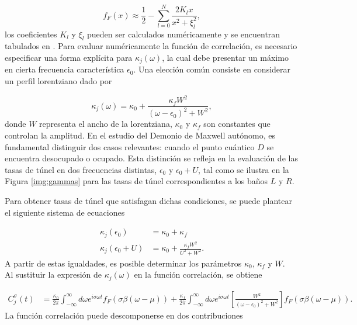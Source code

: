 \begin{appendixs}
\begin{equation}
    f_{F}(x) \approx \frac{1}{2} - \sum_{l=0}^{N} \frac{ 2 K_{l}x }{ x^{2} + \xi^{2}_{l} },
    \label{apendix5:pade}
\end{equation}
los coeficientes $K_{l}$ y $\xi_{l}$ pueden ser calculados numéricamente y se encuentran tabulados en \cite{hu2011pade}. Para evaluar numéricamente la función de correlación, es necesario especificar una forma explícita para $\kappa_{j}(\omega)$, la cual debe presentar un máximo en cierta frecuencia característica $\epsilon_{0}$. Una elección común consiste en considerar un perfil lorentziano dado por

\begin{equation*}
    \kappa_{j}(\omega) = \kappa_{0} + \frac{\kappa_{f} W^{2}}{(\omega - \epsilon_{0})^{2} + W^{2}},
\end{equation*}
donde $W$ representa el ancho de la lorentziana, $\kappa_{0}$ y $\kappa_{f}$ son constantes que controlan la amplitud. En el estudio del Demonio de Maxwell autónomo, es fundamental distinguir dos casos relevantes: cuando el punto cuántico $D$ se encuentra desocupado o ocupado. Esta distinción se refleja en la evaluación de las tasas de túnel en dos frecuencias distintas, $\epsilon_{0}$ y $\epsilon_{0} + U$, tal como se ilustra en la Figura \ref{img:gammas} para las tasas de túnel correspondientes a los baños $L$ y $R$.


Para obtener tasas de túnel que satisfagan dichas condiciones, se puede plantear el siguiente sistema de ecuaciones 

\begin{align*}
    \kappa_{j}(\epsilon_{0}) & = \kappa_{0} + \kappa_{f} \\
    \kappa_{j}(\epsilon_{0} + U) & = \kappa_{0} + \frac{\kappa_{f} W^{2} }{U^{2} + W^{2}}.
\end{align*}
A partir de estas igualdades, es posible determinar los parámetros $\kappa_{0}$, $\kappa_{f}$ y $W$. 
\\

Al sustituir la expresión de $\kappa_{j}(\omega)$ en la función correlación, se obtiene

\begin{align*}
    C^{\sigma}_{j}(t) & = \frac{\kappa_{0}}{2\pi} \int_{-\infty}^{\infty}d\omega e^{i\sigma \omega t} f_{F}(\sigma \beta (\omega-\mu)) + \frac{\kappa_{f}}{2\pi} \int_{-\infty}^{\infty}d\omega e^{i\sigma \omega t}\left[ \frac{W^{2}}{(\omega-\epsilon_{0})^{2} + W^{2}} \right] f_{F}(\sigma \beta (\omega-\mu)).
\end{align*}
La función correlación puede descomponerse en dos contribuciones


\end{appendixs}
